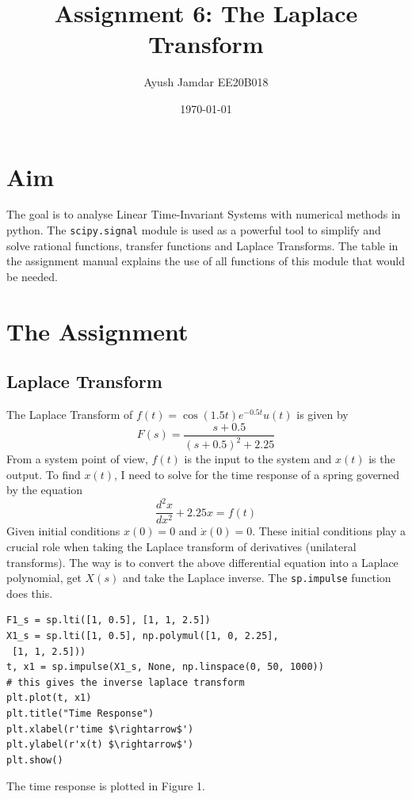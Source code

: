 \documentclass[11pt, a4paper]{article}
\title{Assignment 6: The Laplace Transform} %
\author{Ayush Jamdar EE20B018} %
\date{\today} %
\begin{document}
		
		
\maketitle %
\section{Aim}
The goal is to analyse Linear Time-Invariant Systems with numerical methods in python. The \texttt{scipy.signal} 
module is used as a powerful tool to simplify and solve rational functions, transfer functions and Laplace Transforms. The table in the assignment manual explains the use of all functions of this module that would be needed.

\section{The Assignment}
\subsection{Laplace Transform}
The Laplace Transform of $f(t)=\cos(1.5t)e^{-0.5t}u(t)$ is given by $$F(s)=\frac{s+0.5}{(s+0.5)^2+2.25}$$
From a system point of view, $f(t)$ is the input to the system and $x(t)$ is the output. To find $x(t)$, I need to solve for the time response of a spring governed by the equation $$\frac{d^2x}{dx^2}+2.25x=f(t)$$
Given initial conditions $x(0)=0$ and $\dot x(0)=0$. These initial conditions play a crucial role when taking the Laplace transform of derivatives (unilateral transforms). The way is to convert the above differential equation into a Laplace polynomial, get $X(s)$ and take the Laplace inverse. The \texttt{sp.impulse} function does this.

\begin{verbatim}
F1_s = sp.lti([1, 0.5], [1, 1, 2.5])
X1_s = sp.lti([1, 0.5], np.polymul([1, 0, 2.25],
 [1, 1, 2.5]))
t, x1 = sp.impulse(X1_s, None, np.linspace(0, 50, 1000))
# this gives the inverse laplace transform
plt.plot(t, x1)
plt.title("Time Response")
plt.xlabel(r'time $\rightarrow$')
plt.ylabel(r'x(t) $\rightarrow$')
plt.show()
\end{verbatim}

The time response is plotted in Figure 1.
\end{document}
